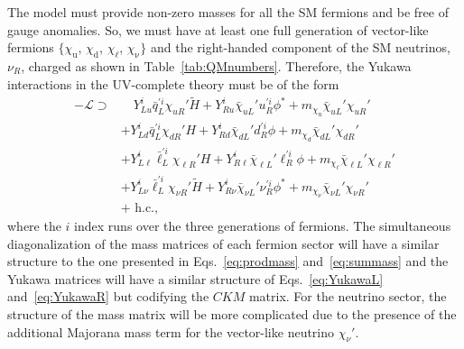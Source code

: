 The model must provide non-zero masses for all the SM fermions and be free of gauge anomalies. So, we must have at least one full generation of vector-like fermions $\{\chi_\mathrm{u}$, $\chi_\mathrm{d}$, $\chi_\mathrm{\ell}$, $\chi_\mathrm{\nu}\}$ and the right-handed component of the SM neutrinos, $\nu_R$, charged as shown in Table~\ref{tab:QMnumbers}. Therefore, the Yukawa interactions in the UV-complete theory must be of the form
\begin{equation}
    \begin{aligned}
        -\mathcal{L}
        \supset&\quad
        Y_{L u}^i \bar{q}_L^{\prime i} \chi_{u R}' \widetilde{H}
        + Y_{R u}^i \bar{\chi}_{u L}' u_R^{\prime i} \phi^*  
        + m_{\chi_\mathrm{u}} \bar{\chi}_{u L}' \chi_{u R}'
        \\&
        +Y_{L d}^i \bar{q}_L^{\prime i} \chi_{d R}' H 
        +Y_{R d}^i \bar{\chi}_{d L}' d_R^{\prime i} \phi
        +m_{\chi_d} \bar{\chi}_{d L}' \chi_{d R}'
        \\&
        +Y_{L \ell}^{i} \bar{\ell}_L^{\prime i} \chi_{\ell R}' H
        +Y_{R \ell}^{i} \bar{\chi}_{\ell L}' \ell_R^{\prime i} \phi
        +m_{\chi_\ell} \bar{\chi}_{\ell L}' \chi_{\ell R}'
        \\
        &
        +Y_{L \nu}^{i} \bar{\ell}_L^{\prime i} \chi_{\nu R}' \widetilde{H}
        +Y_{R \nu}^{i} \bar{\chi}_{\nu L}' \nu_R^{\prime i} \phi^*
        +m_{\chi_\nu} \bar{\chi}_{\nu L}' \chi_{\nu R}' \\
        &+\text { h.c., }
    \end{aligned}
\end{equation}
where the $i$ index runs over the three generations of fermions. The simultaneous diagonalization of the mass matrices of each fermion sector will have a similar structure to the one presented in Eqs.~\ref{eq:prodmass} and~\ref{eq:summass} and the Yukawa matrices will have a similar structure of Eqs.~\ref{eq:YukawaL} and~\ref{eq:YukawaR} but codifying the $CKM$ matrix. For the neutrino sector, the structure of the mass matrix will be more complicated due to the presence of the additional Majorana mass term for the vector-like neutrino $\chi_\nu'$.

